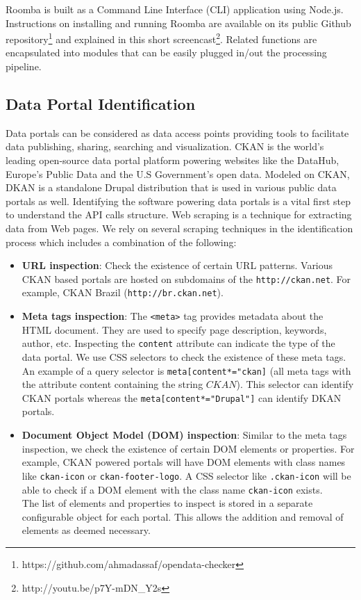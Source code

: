 \documentclass{sig-alternate}
\begin{document}
Roomba is built as a Command Line Interface (CLI) application using Node.js. Instructions on installing and running Roomba are available on its public Github repository\footnote{https://github.com/ahmadassaf/opendata-checker} and explained in this short screencast\footnote{http://youtu.be/p7Y-mDN\_Y2s}. Related functions are encapsulated into modules that can be easily plugged in/out the processing pipeline.

\subsection{Data Portal Identification}

Data portals can be considered as data access points providing tools to facilitate data publishing, sharing, searching and visualization. CKAN is the world's leading open-source data portal platform powering websites like the DataHub, Europe's Public Data and the U.S Government's open data. Modeled on CKAN, DKAN is a standalone Drupal distribution that is used in various public data portals as well.
Identifying the software powering data portals is a vital first step to understand the API calls structure. Web scraping is a technique for extracting data from Web pages. We rely on several scraping techniques in the identification process which includes a combination of the following:

\begin{itemize}
  \item \textbf{URL inspection}: Check the existence of certain URL patterns. Various CKAN based portals are hosted on subdomains of the \texttt{http://ckan.net}. For example, CKAN Brazil (\texttt{http://br.ckan.net}).
  \item \textbf{Meta tags inspection}: The \texttt{<meta>} tag provides metadata about the HTML document. They are used to specify page description, keywords, author, etc. Inspecting the \texttt{content} attribute can indicate the type of the data portal. We use CSS selectors to check the existence of these meta tags. An example of a query selector is \texttt{meta[content*="ckan]} (all meta tags with the attribute content containing the string $CKAN$). This selector can identify CKAN portals whereas the \texttt{meta[content*="Drupal"]} can identify DKAN portals.
  \item \textbf{Document Object Model (DOM) inspection}: Similar to the meta tags inspection, we check the existence of certain DOM elements or properties. For example, CKAN powered portals will have DOM elements with class names like \texttt{ckan-icon} or \texttt{ckan-footer-logo}. A CSS selector like \texttt{.ckan-icon} will be able to check if a DOM element with the class name \texttt{ckan-icon} exists.\\
  The list of elements and properties to inspect is stored in a separate configurable object for each portal. This allows the addition and removal of elements as deemed necessary.
\end{itemize}
\end{document}
